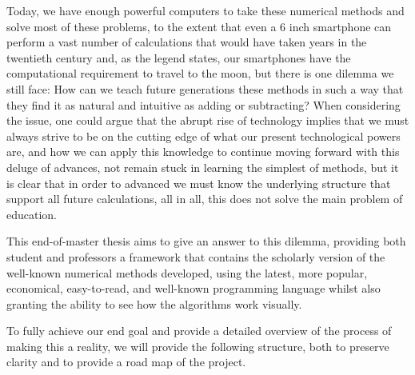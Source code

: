 Today, we have enough powerful computers to take these numerical methods and solve most of these problems, to the extent that even a 6 inch smartphone can perform a vast number of calculations that would have taken years in the twentieth century and, as the legend states, our smartphones have the computational requirement to travel to the moon, but there is one dilemma we still face: How can we teach future generations these methods in such a way that they find it as natural and intuitive as adding or subtracting? When considering the issue, one could argue that the abrupt rise of technology implies that we must always strive to be on the cutting edge of what our present technological powers are, and how we can apply this knowledge to continue moving forward with this deluge of advances, not remain stuck in learning the simplest of methods, but it is clear that in order to advanced we must know the underlying structure that support all future calculations, all in all, this does not solve the main problem of education.


This end-of-master thesis aims to give an answer to this dilemma, providing both student and professors a framework that contains the scholarly version of the well-known numerical methods developed, using the latest, more popular, economical, easy-to-read, and well-known programming language whilst also granting the ability to see how the algorithms work visually.  

To fully achieve our end goal and provide a detailed overview of the process of making this a reality, we will provide the following structure, both to preserve clarity and to provide a road map of the project. 

